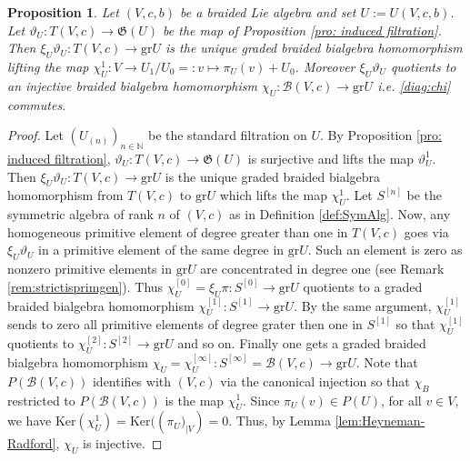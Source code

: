 \documentclass[english]{amsart}
\numberwithin{equation}{section}
\numberwithin{figure}{section}
\theoremstyle{plain}
\theoremstyle{definition}
\theoremstyle{definition}
\theoremstyle{remark}
\theoremstyle{remark}
\theoremstyle{plain}
\theoremstyle{plain}
\newtheorem{prop}[thm]{Proposition}
\theoremstyle{plain}
\begin{document}
\begin{prop}
\label{pro:omegaB}Let $\left(V,c,b\right)$ be a braided Lie algebra
and set $U:=U(V,c,b)$. Let $\vartheta_{U}:T\left(V,c\right)\rightarrow\mathfrak{G}\left(U\right)$
be the map of Proposition \ref{pro: induced filtration}. Then $\xi_{U}\vartheta_{U}:T\left(V,c\right)\rightarrow\mathrm{gr}U$
is the unique graded braided bialgebra homomorphism lifting the map
$\chi_{U}^{1}:V\rightarrow U_{1}/U_{0}=:v\mapsto\pi_{U}\left(v\right)+U_{0}$.
Moreover $\xi_{U}\vartheta_{U}$ quotients to an injective braided
bialgebra homomorphism $\chi_{U}:\mathcal{B}\left(V,c\right)\rightarrow\mathrm{gr}U$
i.e. \eqref{diag:chi} commutes.\end{prop}
\begin{proof}
Let $\left(U_{\left(n\right)}\right)_{n\in\mathbb{N}}$ be the standard
filtration on $U$. By Proposition \ref{pro: induced filtration},
$\vartheta_{U}:T\left(V,c\right)\rightarrow\mathfrak{G}\left(U\right)$
is surjective and lifts the map $\vartheta_{U}^{1}$. Then $\xi_{U}\vartheta_{U}:T\left(V,c\right)\rightarrow\mathrm{gr}U$
is the unique graded braided bialgebra homomorphism from $T\left(V,c\right)$
to $\mathrm{gr}U$ which lifts the map $\chi_{U}^{1}$. Let $S^{[n]}$
be the symmetric algebra of rank $n$ of $\left(V,c\right)$ as in
Definition \ref{def:SymAlg}. Now, any homogeneous primitive element
of degree greater than one in $T\left(V,c\right)$ goes via $\xi_{U}\vartheta_{U}$
in a primitive element of the same degree in $\mathrm{gr}U$. Such
an element is zero as nonzero primitive elements in $\mathrm{gr}U$
are concentrated in degree one (see Remark \ref{rem:strictisprimgen}). Thus $\chi_{U}^{\left[0\right]}=\xi_{U}\pi:S^{\left[0\right]}\rightarrow\mathrm{gr}U$
quotients to a graded braided bialgebra homomorphism $\chi_{U}^{\left[1\right]}:S^{\left[1\right]}\rightarrow\mathrm{gr}U$.
 By the same argument, $\chi_{U}^{\left[1\right]}$ sends to zero
all primitive elements of degree grater then one in $S^{\left[1\right]}$
so that $\chi_{U}^{\left[1\right]}$ quotients to $\chi_{U}^{\left[2\right]}:S^{\left[2\right]}\rightarrow\mathrm{gr}U$
and so on. Finally one gets a graded braided bialgebra homomorphism
$\chi_{U}=\chi_{U}^{\left[\infty\right]}:S^{\left[\infty\right]}=\mathcal{B}\left(V,c\right)\rightarrow\mathrm{gr}U$.
Note that $P\left(\mathcal{B}\left(V,c\right)\right)$ identifies
with $\left(V,c\right)$ via the canonical injection so that $\chi_{B}$
restricted to $P\left(\mathcal{B}\left(V,c\right)\right)$ is the
map $\chi_{U}^{1}$. Since $\pi_{U}\left(v\right)\in P\left(U\right)$, for all $v\in V$,
we have $\mathrm{Ker}(\chi_{U}^{1})=\mathrm{Ker}(\left(\pi_{U})_{\mid V}\right)=0$.
Thus, by Lemma \ref{lem:Heyneman-Radford}, $\chi_{U}$ is injective. \end{proof}
\end{document}
